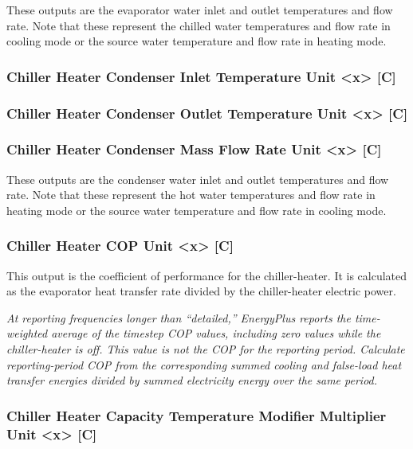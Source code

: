 These outputs are the evaporator water inlet and outlet temperatures and flow rate. Note that these represent the chilled water temperatures and flow rate in cooling mode or the source water temperature and flow rate in heating mode.

\subsubsection{Chiller Heater Condenser Inlet Temperature Unit \textless{}x\textgreater{} {[}C{]}}\label{chiller-heater-condenser-inlet-temperature-unit-x-c}

\subsubsection{Chiller Heater Condenser Outlet Temperature Unit \textless{}x\textgreater{} {[}C{]}}\label{chiller-heater-condenser-outlet-temperature-unit-x-c}

\subsubsection{Chiller Heater Condenser Mass Flow Rate Unit \textless{}x\textgreater{} {[}C{]}}\label{chiller-heater-condenser-mass-flow-rate-unit-x-c}

These outputs are the condenser water inlet and outlet temperatures and flow rate. Note that these represent the hot water temperatures and flow rate in heating mode or the source water temperature and flow rate in cooling mode.

\subsubsection{Chiller Heater COP Unit \textless{}x\textgreater{} {[}C{]}}\label{chiller-heater-cop-unit-x-c}

This output is the coefficient of performance for the chiller-heater. It is calculated as the evaporator heat transfer rate divided by the chiller-heater electric power.

\emph{At reporting frequencies longer than ``detailed,'' EnergyPlus reports the time-weighted average of the timestep COP values, including zero values while the chiller-heater is off. This value is not the COP for the reporting period. Calculate reporting-period COP from the corresponding summed cooling and false-load heat transfer energies divided by summed electricity energy over the same period.}

\subsubsection{Chiller Heater Capacity Temperature Modifier Multiplier Unit \textless{}x\textgreater{} {[}C{]}}\label{chiller-heater-capacity-temperature-modifier-multiplier-unit-x-c}

